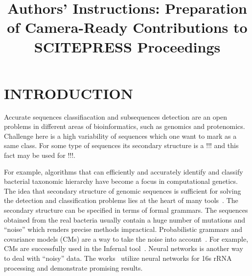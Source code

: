 \documentclass[a4paper,twoside]{article}
\begin{document}
\title{Authors' Instructions: Preparation of Camera-Ready Contributions to SCITEPRESS Proceedings}

\author{
}



\onecolumn \maketitle \normalsize \vfill

\section{\uppercase{Introduction}}
\label{sec:introduction}

\noindent Accurate sequences classifiacation and subsequences detection are an open problems in different areas of bioinformatics, such as genomics and protenomics. 
Challenge here is a high variability of sequences which one want to mark as a same class.
For some type of sequences its secondary structure is a !!! and this fact may be used for !!!.

For example, algorithms that can efficiently and accurately identify and classify bacterial taxonomic hierarchy have become a focus in computational genetics.
The idea that secondary structure of genomic sequences is sufficient for solving the detection and classification problems lies at the heart of many tools~\cite{GrammarsRNA,PCFG,meta,LWPCFG}. 
The secondary structure can be specified in terms of formal grammars. 
The sequences obtained from the real bacteria usually contain a huge number of mutations and ``noise'' which renders precise methods impractical. 
Probabilistic grammars and covariance models (CMs) are a way to take the noise into account~\cite{EddyDurbin}.
For example, CMs are successfully used in the Infernal tool~\cite{Infernal}.
Neural networks is another way to deal with ``noisy'' data. 
The works~\cite{Humidor,ANN} utilize neural networks for 16s rRNA processing and demonstrate promising results.
\end{document}
